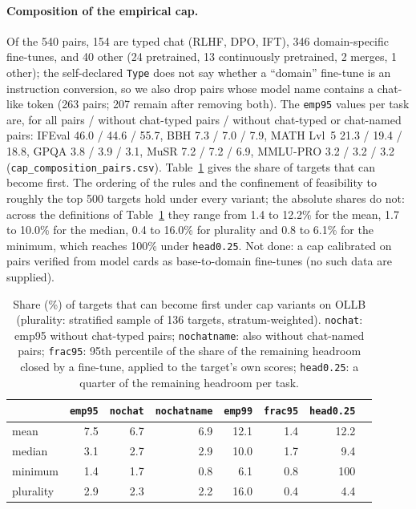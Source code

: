 \paragraph{Composition of the empirical cap.}
Of the 540 pairs, 154 are typed chat (RLHF, DPO, IFT), 346 domain-specific fine-tunes, and 40 other (24 pretrained, 13 continuously pretrained, 2 merges, 1 other); the self-declared \texttt{Type} does not say whether a ``domain'' fine-tune is an instruction conversion, so we also drop pairs whose model name contains a chat-like token (263 pairs; 207 remain after removing both). The \texttt{emp95} values per task are, for all pairs / without chat-typed pairs / without chat-typed or chat-named pairs: IFEval 46.0 / 44.6 / 55.7, BBH 7.3 / 7.0 / 7.9, MATH Lvl~5 21.3 / 19.4 / 18.8, GPQA 3.8 / 3.9 / 3.1, MuSR 7.2 / 7.2 / 6.9, MMLU-PRO 3.2 / 3.2 / 3.2 (\texttt{cap\_composition\_pairs.csv}). Table~\ref{tab:capvar} gives the share of targets that can become first. The ordering of the rules and the confinement of feasibility to roughly the top 500 targets hold under every variant; the absolute shares do not: across the definitions of Table~\ref{tab:capvar} they range from 1.4 to 12.2\% for the mean, 1.7 to 10.0\% for the median, 0.4 to 16.0\% for plurality and 0.8 to 6.1\% for the minimum, which reaches 100\% under \texttt{head0.25}. Not done: a cap calibrated on pairs verified from model cards as base-to-domain fine-tunes (no such data are supplied).

\begin{table}[h]
\centering\small
\caption{Share (\%) of targets that can become first under cap variants on OLLB (plurality: stratified sample of 136 targets, stratum-weighted). \texttt{nochat}: emp95 without chat-typed pairs; \texttt{nochatname}: also without chat-named pairs; \texttt{frac95}: 95th percentile of the share of the remaining headroom closed by a fine-tune, applied to the target's own scores; \texttt{head0.25}: a quarter of the remaining headroom per task.}\label{tab:capvar}
\begin{tabular}{lrrrrrrr}
\toprule
 & \texttt{emp95} & \texttt{nochat} & \texttt{nochatname} & \texttt{emp99} & \texttt{frac95} & \texttt{head0.25}\\
\midrule
mean & 7.5 & 6.7 & 6.9 & 12.1 & 1.4 & 12.2\\
median & 3.1 & 2.7 & 2.9 & 10.0 & 1.7 & 9.4\\
minimum & 1.4 & 1.7 & 0.8 & 6.1 & 0.8 & 100\\
plurality & 2.9 & 2.3 & 2.2 & 16.0 & 0.4 & 4.4\\
\bottomrule
\end{tabular}
\end{table}

